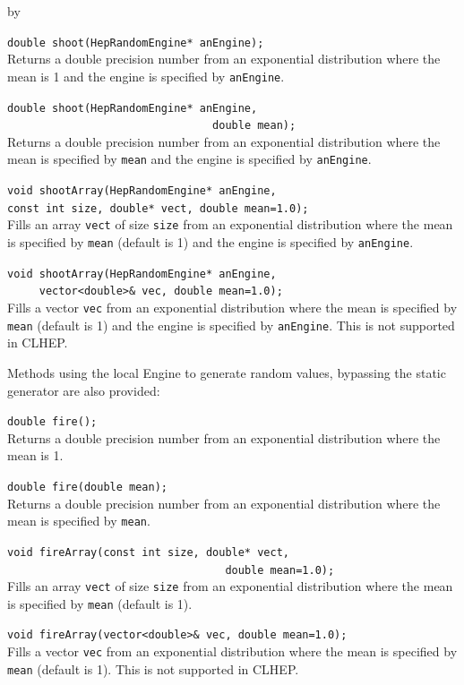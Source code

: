 \documentclass[twoside]{article}
\newcommand{\comp}[1]{\texttt{#1}}%
\newcommand{\entrylabel}[1]{\mbox{\textbf{{#1}}}\hfil}%
\newenvironment{entry}
{\begin{list}{}%
    {\renewcommand{\makelabel}{\entrylabel}%
     \setlength{\labelwidth}{90pt}%
     \setlength{\leftmargin}{\labelwidth}
     \advance\leftmargin by \labelsep%
      }%
    }%
  {\end{list}}
\newcommand{\Entrylabel}[1]%
{\raisebox{0pt}[1ex][0pt]{\makebox[\labelwidth][l]%
    {\parbox[t]{\labelwidth}{\hspace{0pt}\textbf{{#1}}}}}}
\newenvironment{Entry}%
{\renewcommand{\entrylabel}{\Entrylabel}\begin{entry}}%
  {\end{entry}}
\begin{document}
\begin{description}
\begin{Entry}
   \verb+double shoot(HepRandomEngine* anEngine);+\\
   Returns a double precision number from an exponential  distribution where the
   mean is 1 and the engine is specified by \comp{anEngine}.
  
   \verb+double shoot(HepRandomEngine* anEngine,+\\
   \verb+                                double mean);+\\
   Returns a double precision number from an exponential distribution where the
   mean is specified by \comp{mean} and the engine is specified
   by \comp{anEngine}.
  
   \verb+void shootArray(HepRandomEngine* anEngine,+\\
   \verb+const int size, double* vect, double mean=1.0);+\\
   Fills an array \comp{vect} of size \comp{size} from an exponential distribution
   where the mean is specified by \comp{mean} (default is 1) and
   the engine is specified by \comp{anEngine}.

   \verb+void shootArray(HepRandomEngine* anEngine,+\\
   \verb+     vector<double>& vec, double mean=1.0);+\\
   Fills a vector \comp{vec} from an exponential distribution
   where the mean is specified by \comp{mean} (default is 1) and
   the engine is specified by \comp{anEngine}.  This is not supported
   in CLHEP.
   
   Methods using the local Engine to generate random values, bypassing
   the static generator are also provided:

   \verb+double fire();+\\
   Returns a double precision number from an exponential distribution where the
   mean is 1.
  
   \verb+double fire(double mean);+\\
   Returns a double precision number from an exponential distribution where the
   mean is specified by \comp{mean}.

   \verb+void fireArray(const int size, double* vect,+\\
   \verb+                                  double mean=1.0);+\\
   Fills an array \comp{vect} of size \comp{size} from an exponential distribution
   where the mean is specified by \comp{mean} (default is 1).

   \verb+void fireArray(vector<double>& vec, double mean=1.0);+\\
   Fills a vector \comp{vec} from an exponential distribution
   where the mean is specified by \comp{mean} (default is 1).
   This is not supported in CLHEP.


\end{Entry}
\end{description}
\end{document}
